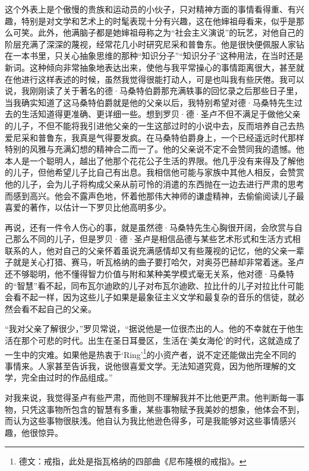 \par 这个外表上是个傲慢的贵族和运动员的小伙子，只对精神方面的事情看得重、有兴趣，特别是对文学和艺术上的时髦表现十分有兴趣，这在他婶祖母看来，似乎是那么可笑。此外，他满脑子都是她婶祖母称之为“社会主义演说”的玩艺，对他自己的阶层充满了深深的蔑视，经常花几小时研究尼采和普鲁东。他是很快便佩服人家钻在一本书里，只关心抽象思维的那种“知识分子”“知识分子”这种用法，在当时还是新词。这种倾向非常抽象地表达出来，使他与我平常操心的事情距离很大，甚至就在他进行这样表述的时候，虽然我觉得很能打动人，可是也叫我有些厌倦。我可以说，我刚刚读了关于著名的德·马桑特伯爵那充满轶事的回忆录之后那些日子里，当我确实知道了这马桑特伯爵就是他的父亲以后，我特别希望对德·马桑特先生过去的生活知道得更准确、更详细一些。想到罗贝·德·圣卢不但不满足于做他父亲的儿子，不但不能将我引进他父亲的一生这部过时的小说中去，反而培养自己去热爱尼采和普鲁东，我真是气得要发疯。在马桑特伯爵身上，一个已经遥远时代那样特别的风雅与充满幻想的精神合二而一了。他的父亲说不定不会赞同我的遗憾。他本人是一个聪明人，越出了他那个花花公子生活的界限。他几乎没有来得及了解他的儿子，但他希望儿子比自己有出息。我相信他可能与家族中其他人相反，会赞赏他的儿子，会为儿子将构成父亲从前可怜的消遣的东西抛在一边去进行严肃的思考而感到高兴。他会不露声色地，怀着他那伟大神师的谦虚精神，去偷偷阅读儿子最喜爱的著作，以估计一下罗贝比他高明多少。
\par 再说，还有一件令人伤心的事，就是虽然德·马桑特先生心胸很开阔，会欣赏与自己那么不同的儿子，但是罗贝·德·圣卢是相信品德与某些艺术形式和生活方式相联系的人，他对自己的父亲怀着虽说充满感情却又有些蔑视的记忆，他的父亲一辈子就是关心打猎、赛马，听瓦格纳的曲子要打哈欠，对奥芬巴赫却非常着迷。圣卢还不够聪明，他不懂得智力价值与附和某种美学模式毫无关系，他对德·马桑特的“智慧”看不起，同布瓦尔迪欧的儿子对布瓦尔迪欧、拉比什的儿子对拉比什可能会看不起一样，因为这些儿子如果是最象征主义文学和最复杂的音乐的信徒，就必然会看不起自己的父亲。
\par “我对父亲了解很少，”罗贝常说，“据说他是一位很杰出的人。他的不幸就在于他生活在那个可悲的时代。出生在圣日耳曼区，生活在‘美女海伦’的时代，这就造成了一生中的灾难。如果他是热衷于‘Ring’\footnote{德文：戒指，此处是指瓦格纳的四部曲《尼布隆根的戒指》。}的小资产者，说不定还能做出完全不同的事情来。人家甚至告诉我，说他很喜爱文学。无法知道究竟，因为他所理解的文学，完全由过时的作品组成。”
\par 对我来说，我觉得圣卢有些严肃，而他则不理解我并不比他更严肃。他判断每一事物，只凭这事物所包含的智慧有多重，某些事物赋予我美妙的想象，他体会不到，而认为这些事物很肤浅。他自认为我比他逊色得多，可是我能够对这些事情感兴趣，他很惊异。
